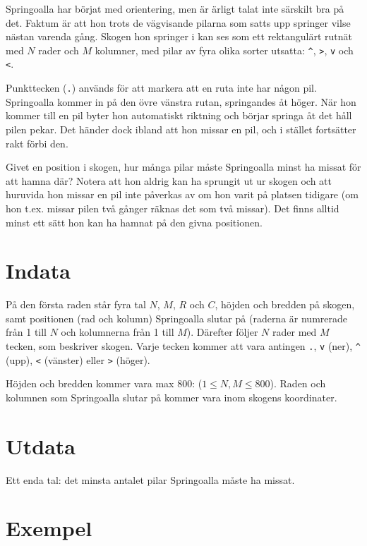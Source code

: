 Springoalla har börjat med orientering, men är ärligt talat inte
särskilt bra på det. Faktum är att hon trots de vägvisande pilarna
som satts upp springer vilse nästan varenda gång. Skogen hon springer
i kan ses som ett rektangulärt rutnät med $N$ rader och $M$ kolumner,
med pilar av fyra olika sorter utsatta: \verb+^+, \texttt{>},
\texttt{v} och \texttt{<}.

Punkttecken (\texttt{.}) används för att markera att en ruta inte har någon
pil. Springoalla
kommer in på den övre vänstra rutan, springandes åt höger. När hon
kommer till en pil byter hon automatiskt riktning och börjar springa
åt det håll pilen pekar. Det händer dock ibland att hon missar en
pil, och i stället fortsätter rakt förbi den.

Givet en position i skogen, hur många pilar måste Springoalla minst ha
missat för att hamna där? Notera att hon aldrig kan ha sprungit ut ur
skogen och att huruvida hon missar en pil inte påverkas av om hon varit
på platsen tidigare (om hon t.ex. missar pilen två gånger räknas det
som två missar). Det finns alltid minst ett sätt hon kan ha hamnat på den givna positionen.

\section*{Indata}

På den första raden står fyra tal $N$, $M$, $R$ och $C$, höjden och
bredden på skogen, samt positionen (rad och kolumn) Springoalla slutar
på (raderna är numrerade från 1 till $N$ och kolumnerna från 1 till
$M$). Därefter följer $N$ rader med $M$ tecken, som beskriver skogen.
Varje tecken kommer att vara antingen \texttt{.}, \texttt{v} (ner),
\verb+^+ (upp), \texttt{<} (vänster) eller \texttt{>} (höger).

Höjden och bredden kommer vara max $800$: ($1 \leq N,M \leq 800$). Raden och kolumnen som
Springoalla slutar på kommer vara inom skogens koordinater.

\section*{Utdata}

Ett enda tal: det minsta antalet pilar Springoalla måste ha missat.

\section*{Exempel}

